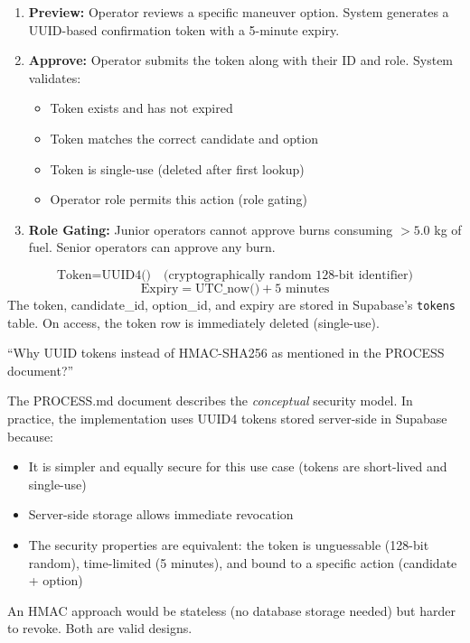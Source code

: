 \documentclass[12pt,a4paper]{article}
\begin{document}
\begin{enumerate}
    \item \textbf{Preview:} Operator reviews a specific maneuver option. System generates a UUID-based confirmation token with a 5-minute expiry.
    \item \textbf{Approve:} Operator submits the token along with their ID and role. System validates:
    \begin{itemize}
        \item Token exists and has not expired
        \item Token matches the correct candidate and option
        \item Token is single-use (deleted after first lookup)
        \item Operator role permits this action (role gating)
    \end{itemize}
    \item \textbf{Role Gating:} Junior operators cannot approve burns consuming $> 5.0$ kg of fuel. Senior operators can approve any burn.
\end{enumerate}

\begin{formulabox}[title=Token Generation (Simplified)]
\[
\text{Token} = \text{UUID4()} \quad \text{(cryptographically random 128-bit identifier)}
\]
\[
\text{Expiry} = \text{UTC\_now()} + 5 \text{ minutes}
\]
The token, candidate\_id, option\_id, and expiry are stored in Supabase's \texttt{tokens} table. On access, the token row is immediately deleted (single-use).
\end{formulabox}

\begin{questionbox}
``Why UUID tokens instead of HMAC-SHA256 as mentioned in the PROCESS document?''
\end{questionbox}
\begin{answerbox}
The PROCESS.md document describes the \textit{conceptual} security model. In practice, the implementation uses UUID4 tokens stored server-side in Supabase because:
\begin{itemize}
    \item It is simpler and equally secure for this use case (tokens are short-lived and single-use)
    \item Server-side storage allows immediate revocation
    \item The security properties are equivalent: the token is unguessable (128-bit random), time-limited (5 minutes), and bound to a specific action (candidate + option)
\end{itemize}
An HMAC approach would be stateless (no database storage needed) but harder to revoke. Both are valid designs.
\end{answerbox}
\end{document}
